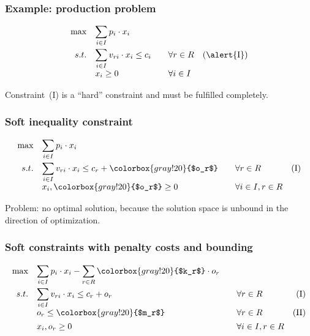 \begin{frame}
 \frametitle{Example: production problem}
 \begin{equation*}
  \begin{array}{rllr}
    \max & \displaystyle\sum_{i\in I} p_i\cdot x_i & & \\[3ex]
    s.t. & \displaystyle\sum_{i\in I} v_{ri}\cdot x_i \leq c_i & \quad\forall r\in R & \mathrm{(\alert{I})}\\
	  & x_i \geq 0 & \quad\forall i\in I & \\
  \end{array}
 \end{equation*}
 
 Constraint~\textrm{(\alert{I})} is a ``hard'' constraint and must be fulfilled completely.
\end{frame}

\begin{frame}
 \frametitle{Soft inequality constraint}
 \begin{equation*}
  \begin{array}{rllr}
    \max & \displaystyle\sum_{i\in I} p_i\cdot x_i & & \\[3ex]
    s.t. & \displaystyle\sum_{i\in I} v_{ri}\cdot x_i \leq c_r + \colorbox{gray!20}{$o_r$} & \quad\forall r\in R & \mathrm{(I)}\\
	  & x_i, \colorbox{gray!20}{$o_r$} \geq 0 & \quad\forall i\in I, r\in R & \\
  \end{array}
 \end{equation*}
 
 Problem: no optimal solution, because the solution space is unbound in the direction of optimization.
\end{frame}

\begin{frame}
 \frametitle{Soft constraints with penalty costs and bounding}
 \begin{equation*}
  \begin{array}{rllr}
    \max & \displaystyle\sum_{i\in I} p_i\cdot x_i - \sum_{r\in R} \colorbox{gray!20}{$k_r$} \cdot o_r & & \\[3ex]
    s.t. & \displaystyle\sum_{i\in I} v_{ri}\cdot x_i \leq c_r + o_r & \quad\forall r\in R & \mathrm{(I)}\\
	& o_r \leq \colorbox{gray!20}{$m_r$} & \quad\forall r\in R & \mathrm{(II)}\\[1ex]
	& x_i,o_r \geq 0 & \quad\forall i\in I, r\in R & \\
  \end{array}
 \end{equation*}  
\end{frame}

